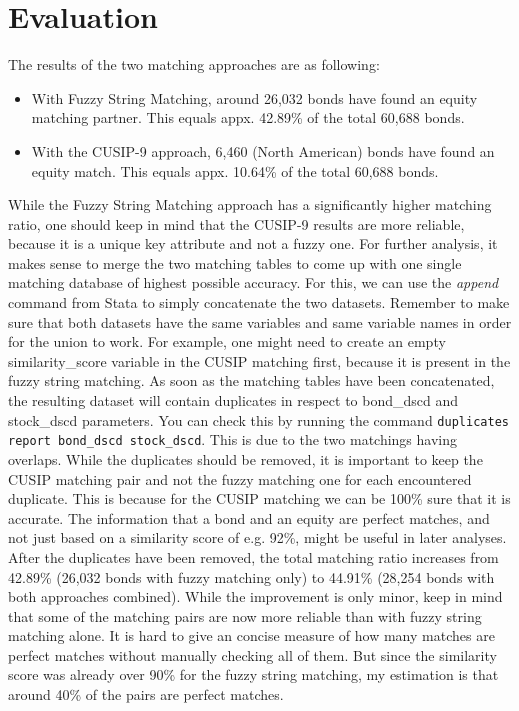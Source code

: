 \section{Evaluation} \label{section:matching-evaluation}
The results of the two matching approaches are as following: 
\begin{itemize}
	\item With Fuzzy String Matching, around 26,032 bonds have found an equity matching partner. This equals appx. 42.89\% of the total 60,688 bonds. 
	\item With the CUSIP-9 approach, 6,460 (North American) bonds have found an equity match. This equals appx. 10.64\% of the total 60,688 bonds. 
\end{itemize}
While the Fuzzy String Matching approach has a significantly higher matching ratio, one should keep in mind that the CUSIP-9 results are more reliable, because it is a unique key attribute and not a fuzzy one. For further analysis, it makes sense to merge the two matching tables to come up with one single matching database of highest possible accuracy. For this, we can use the \textit{append} command from Stata to simply concatenate the two datasets. Remember to make sure that both datasets have the same variables and same variable names in order for the union to work. For example, one might need to create an empty similarity\_score variable in the CUSIP matching first, because it is present in the fuzzy string matching. 
As soon as the matching tables have been concatenated, the resulting dataset will contain duplicates in respect to bond\_dscd and stock\_dscd parameters. You can check this by running the command \lstinline|duplicates report bond_dscd stock_dscd|. This is due to the two matchings having overlaps. While the duplicates should be removed, it is important to keep the CUSIP matching pair and not the fuzzy matching one for each encountered duplicate. This is because for the CUSIP matching we can be 100\% sure that it is accurate. The information that a bond and an equity are perfect matches, and not just based on a similarity score of e.g. 92\%, might be useful in later analyses. 
After the duplicates have been removed, the total matching ratio increases from 42.89\% (26,032 bonds with fuzzy matching only) to 44.91\% (28,254 bonds with both approaches combined). While the improvement is only minor, keep in mind that some of the matching pairs are now more reliable than with fuzzy string matching alone. It is hard to give an concise measure of how many matches are perfect matches without manually checking all of them. But since the similarity score was already over 90\% for the fuzzy string matching, my estimation is that around 40\% of the pairs are perfect matches. 








